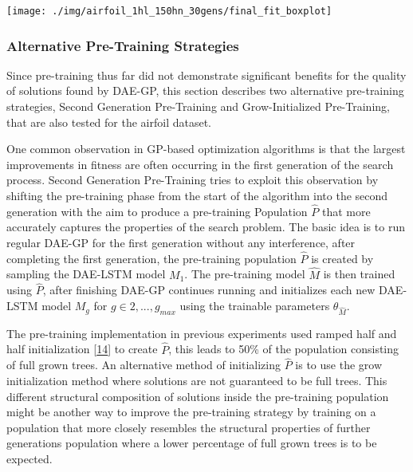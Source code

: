 \documentclass[
  11pt,
]{article}
\let\origfigure\figure
\let\endorigfigure\endfigure
\renewenvironment{figure}[1][2] {
    \expandafter\origfigure\expandafter[H]
} {
    \endorigfigure
}
\begin{document}
\begin{figure}[c]

{\centering \texttt{[image: ./img/airfoil\_1hl\_150hn\_30gens/final\_fit\_boxplot]} 

}

\caption{Fitness after 30 Generations - Airfoil - Single Hidden Layer}\label{fig:airfoil-finalFitness}
\end{figure}

\hypertarget{alternative-pre-training-strategies}{%
\subsubsection{Alternative Pre-Training Strategies}\label{alternative-pre-training-strategies}}

Since pre-training thus far did not demonstrate significant benefits for the quality of solutions found by DAE-GP, this section describes two alternative pre-training strategies, Second Generation Pre-Training and Grow-Initialized Pre-Training, that are also tested for the airfoil dataset.

One common observation in GP-based optimization algorithms is that the largest improvements in fitness are often occurring in the first generation of the search process. Second Generation Pre-Training tries to exploit this observation by shifting the pre-training phase from the start of the algorithm into the second generation with the aim to produce a pre-training Population \(\hat{P}\) that more accurately captures the properties of the search problem. The basic idea is to run regular DAE-GP for the first generation without any interference, after completing the first generation, the pre-training population \(\hat{P}\) is created by sampling the DAE-LSTM model \(M_1\). The pre-training model \(\hat{M}\) is then trained using \(\hat{P}\), after finishing DAE-GP continues running and initializes each new DAE-LSTM model \(M_g\) for \(g\in{2,...,g_{max}}\) using the trainable parameters \(\theta_{\hat{M}}\).

The pre-training implementation in previous experiments used ramped half and half initialization {[}\protect\hyperlink{ref-Koza1993GeneticP}{14}{]} to create \(\hat{P}\), this leads to 50\% of the population consisting of full grown trees. An alternative method of initializing \(\hat{P}\) is to use the grow initialization method where solutions are not guaranteed to be full trees. This different structural composition of solutions inside the pre-training population might be another way to improve the pre-training strategy by training on a population that more closely resembles the structural properties of further generations population where a lower percentage of full grown trees is to be expected.
\end{document}
